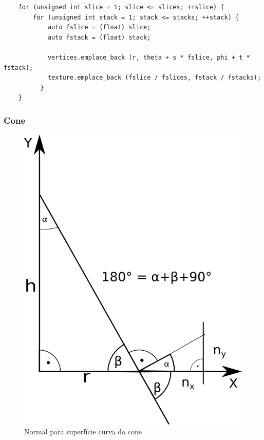 \documentclass[11pt,a4paper]{report}%
\begin{document}
\begin{itemize}
  \label{code:sphere_texCoord}
  \begin{lstlisting}
    for (unsigned int slice = 1; slice <= slices; ++slice) {
        for (unsigned int stack = 1; stack <= stacks; ++stack) {
            auto fslice = (float) slice;
            auto fstack = (float) stack;

            vertices.emplace_back (r, theta + s * fslice, phi + t * fstack);
            texture.emplace_back (fslice / fslices, fstack / fstacks);
          }
    }
  \end{lstlisting}

\end{itemize}

\subsubsection{Cone}
\begin{figure}[H]
  \centering
  \includegraphics[scale=0.2]{cone_normal.png}
  \caption{Normal para superfície curva do cone}
  \label{fig:cone_normal}
\end{figure}
\end{document}
